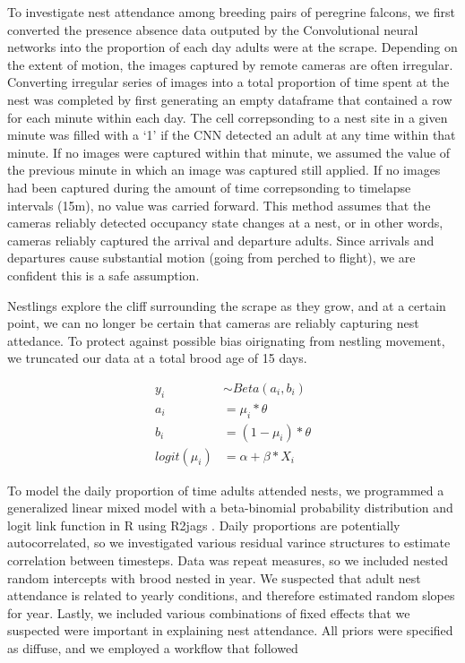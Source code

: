 To investigate nest attendance among breeding pairs of peregrine falcons, we first converted the presence absence data outputed by the Convolutional neural networks into the proportion of each day adults were at the scrape.
Depending on the extent of motion, the images captured by remote cameras are often irregular.
Converting irregular series of images into a total proportion of time spent at the nest was completed by first generating an empty dataframe that contained a row for each minute within each day. 
The cell correpsonding to a nest site in a given minute was filled with a `1' if the CNN detected an adult at any time within that minute.
If no images were captured within that minute, we assumed the value of the previous minute in which an image was captured still applied.
If no images had been captured during the amount of time correpsonding to timelapse intervals (15m), no value was carried forward.
This method assumes that the cameras reliably detected occupancy state changes at a nest, or in other words, cameras reliably captured the arrival and departure adults.
Since arrivals and departures cause substantial motion (going from perched to flight), we are confident this is a safe assumption.

Nestlings explore the cliff surrounding the scrape as they grow, and at a certain point, we can no longer be certain that cameras are reliably capturing nest attedance.
To protect against possible bias oirignating from nestling movement, we truncated our data at a total brood age of 15 days.
 


$$
\begin{align}
y_i &\sim Beta(a_i, b_i) \\
a_i &= \mu_i * \theta \\
b_i &= (1 - \mu_i) * \theta \\
logit(\mu_i) &= \alpha + \beta*X_i
\end{align}
$$

To model the daily proportion of time adults attended nests, we programmed a generalized linear mixed model with a beta-binomial probability distribution and logit link function in R using R2jags \cite{}. 
Daily proportions are potentially autocorrelated, so we investigated various residual varince structures to estimate correlation between timesteps.
Data was repeat measures, so we included nested random intercepts with brood nested in year.
We suspected that adult nest attendance is related to yearly conditions, and therefore estimated random slopes for year.
Lastly, we included various combinations of fixed effects that we suspected were important in explaining nest attendance. 
All priors were specified as diffuse, and we employed a workflow that followed \cite{} %


